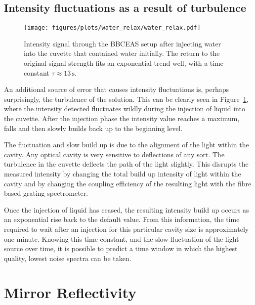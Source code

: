 \subsection{Intensity fluctuations as a result of turbulence}

\begin{figure}
\begin{center}
\texttt{[image: figures/plots/water\_relax/water\_relax.pdf]}
\end{center}
\caption[Intensity during Turbulence Fluid Injection]{Intensity signal through the \ac{BBCEAS} setup after injecting water into the cuvette that contained water initially. The return to the original signal strength fits an exponential trend well, with a time constant $\tau \approx 13\,\text{s}$.}
\label{fig:relax}
\end{figure}

An additional source of error that causes intensity fluctuations is, perhaps
surprisingly, the turbulence of the solution. This can be clearly seen in
Figure~\ref{fig:relax}, where the intensity detected fluctuates wildly during
the injection of liquid into the cuvette. After the injection phase the
intensity value reaches a maximum, falls and then slowly builds back up to the
beginning level.

The fluctuation and slow build up is due to the alignment of the light within
the cavity. Any optical cavity is very sensitive to deflections of any sort.
The turbulence in the cuvette deflects the path of the light slightly.
This disrupts the measured intensity by changing the total build up intensity
of light within the cavity and by changing the coupling efficiency of the
resulting light with the fibre based grating spectrometer.

Once the injection of liquid has ceased, the resulting intensity build
up occurs as an exponential rise back to the default value. From this
information, the time required to wait after an injection for this particular
cavity size is approximately one minute. Knowing this time constant, and the
slow fluctuation of the light source over time, it is possible to predict a
time window in which the highest quality, lowest noise spectra can be taken.



\section{Mirror Reflectivity}\label{sec:mirror_considerations}

